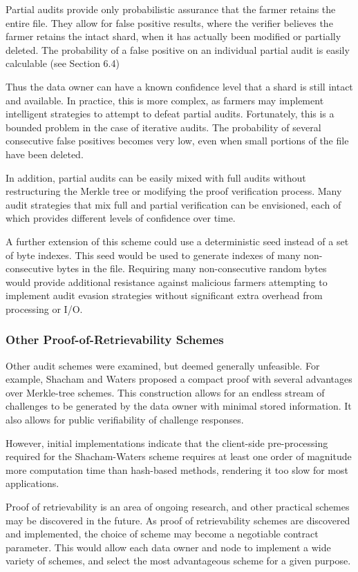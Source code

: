 \documentclass[a4paper,10pt]{article}
\begin{document}
Partial audits provide only probabilistic assurance that the farmer retains the entire file. They allow for false positive results, where the verifier believes the farmer retains the intact shard, when it has actually been modified or partially deleted. The probability of a false positive on an individual partial audit is easily calculable (see Section 6.4)

Thus the data owner can have a known confidence level that a shard is still intact and available. In practice, this is more complex, as farmers may implement intelligent strategies to attempt to defeat partial audits. Fortunately, this is a bounded problem in the case of iterative audits. The probability of several consecutive false positives becomes very low, even when small portions of the file have been deleted.

In addition, partial audits can be easily mixed with full audits without restructuring the Merkle tree or modifying the proof verification process. Many audit strategies that mix full and partial verification can be envisioned, each of which provides different levels of confidence over time.

A further extension of this scheme could use a deterministic seed instead of a set of byte indexes. This seed would be used to generate indexes of many non-consecutive bytes in the file. Requiring many non-consecutive random bytes would provide additional resistance against malicious farmers attempting to implement audit evasion strategies without significant extra overhead from processing or I/O.

\subsubsection{Other Proof-of-Retrievability Schemes}
Other audit schemes were examined, but deemed generally unfeasible. For example, Shacham and Waters proposed a compact proof \cite{6} with several advantages over Merkle-tree schemes. This construction allows for an endless stream of challenges to be generated by the data owner with minimal stored information. It also allows for public verifiability of challenge responses.

However, initial implementations indicate that the client-side pre-processing required for the Shacham-Waters scheme requires at least one order of magnitude more computation time than hash-based methods, rendering it too slow for most applications.

Proof of retrievability is an area of ongoing research, and other practical schemes may be discovered in the future. As proof of retrievability schemes are discovered and implemented, the choice of scheme may become a negotiable contract parameter. This would allow each data owner and node to implement a wide variety of schemes, and select the most advantageous scheme for a given purpose.
\end{document}
